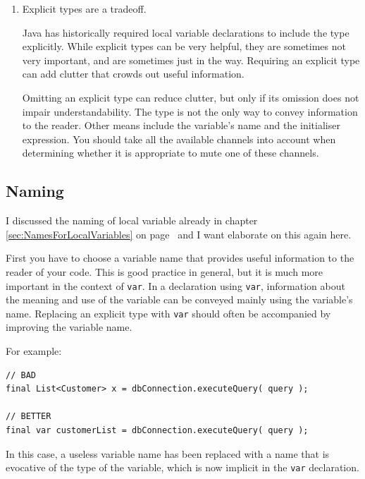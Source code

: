 \documentclass[11pt,a4paper, titlepage, parskip=half, headsepline, footsepline, cleardoublepage=current, headheight=1cm]{scrbook}
\newcommand*{\tqvref}[1]{\hyperref[{#1}]{\ref*{#1}} on page~\pageref{#1}}
\begin{document}
\begin{enumerate}[label=P\arabic*.]
{Code should be self-revealing. It should be understandable on its face, without the need for assistance from tools.}

\item{Explicit types are a tradeoff.

Java has historically required local variable declarations to include the type explicitly. While explicit types can be very helpful, they are sometimes not very important, and are sometimes just in the way. Requiring an explicit type can add clutter that crowds out useful information.

Omitting an explicit type can reduce clutter, but only if its omission does not impair understandability. The type is not the only way to convey information to the reader. Other means include the variable's name and the initialiser expression. You should take all the available channels into account when determining whether it is appropriate to mute one of these channels.}
\end{enumerate}


\subsection{Naming}
I discussed the naming of local variable already in chapter \tqvref{sec:NamesForLocalVariables} and I want elaborate on this again here.

First you have to choose a variable name that provides useful information to the reader of your code. This is good practice in general, but it is much more important in the context of \lstinline|var|. In a declaration using \lstinline|var|, information about the meaning and use of the variable can be conveyed mainly using the variable's name. Replacing an explicit type with \lstinline|var| should often be accompanied by improving the variable name.

For example:
\begin{lstlisting}
// BAD
final List<Customer> x = dbConnection.executeQuery( query );

// BETTER
final var customerList = dbConnection.executeQuery( query );
\end{lstlisting}

In this case, a useless variable name has been replaced with a name that is evocative of the type of the variable, which is now implicit in the \lstinline|var| declaration.
\end{document}
